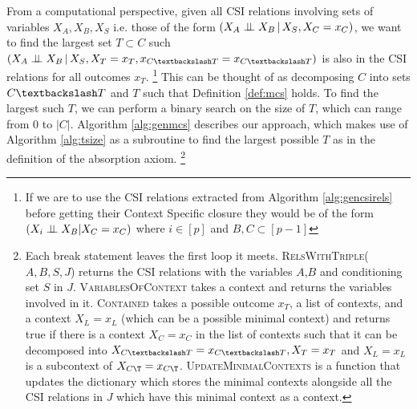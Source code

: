 \documentclass{tufte-book}
\begin{document}
From a computational perspective, given all CSI relations involving sets of variables \(X_A,X_B,X_S\) i.e. those of the form \((X_A \perp \!\!\! \perp X_B \,|\, X_S, X_C=x_C)\), we want to find the largest set \(T \subset C\) such \((X_A \indep X_B \,|\, X_S, X_T=x_T, x_{C \textbackslash T} = x_{C \textbackslash T})\) is also in the CSI relations for all outcomes \(x_T\).  \footnote{If we are to use the CSI relations extracted from Algorithm \ref{alg:gencsirels} before getting their Context Specific closure they would be of the form \\ $(X_i \perp \!\!\! \perp X_B | X_C=x_C)$ where $i \in [p]$ and $B ,C \subset [p-1]$}  This can be thought of as decomposing \(C\) into sets \(C \textbackslash T\) and \(T\) such that Definition \ref{def:mcs} holds. To find the largest such \(T\), we can perform a binary search on the size of \(T\), which can range from \(0\) to \(|C|\). Algorithm \ref{alg:genmcs} describes our approach, which makes use of Algorithm \ref{alg:tsize} as a subroutine to find the largest possible \(T\) as in the definition of the absorption axiom.  \footnote{Each break statement leaves the first loop it meets. \textsc{RelsWithTriple}($A,B,S,J$) returns the CSI relations with the variables $A$,$B$ and conditioning set $S$ in $J$. \textsc{VariablesOfContext} takes a context and returns the variables involved in it. \textsc{Contained} takes a possible outcome $x_T$, a list of contexts, and a context $X_L=x_L$ (which can be a possible minimal context) and returns true if there is a context $X_C=x_C$ in the list of contexts such that it can be decomposed into $X_{C\textbackslash T}=x_{C\textbackslash T}, X_T=x_T$ and $X_L=x_L$ is a subcontext of $X_{C\T}=x_{C\T}$. \textsc{UpdateMinimalContexts} is a function that updates the dictionary which stores the minimal contexts alongside all the CSI relations in $J$ which have this minimal context as a context.} 
\end{document}

